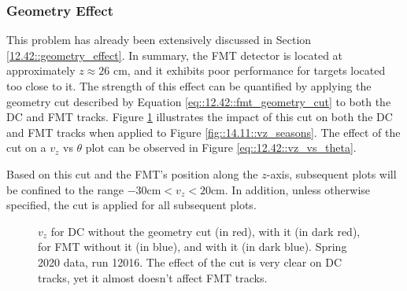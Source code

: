 \subsubsection{Geometry Effect}
\label{14.12::geometry_effect}
    This problem has already been extensively discussed in Section \ref{12.42::geometry_effect}.
    In summary, the FMT detector is located at approximately $z \approx 26$ cm, and it exhibits poor performance for targets located too close to it.
    The strength of this effect can be quantified by applying the geometry cut described by Equation \eqref{eq::12.42::fmt_geometry_cut} to both the DC and FMT tracks.
    Figure \ref{fig::14.12::vz_012016_geomcut} illustrates the impact of this cut on both the DC and FMT tracks when applied to Figure \ref{fig::14.11::vz_seasons}.
    The effect of the cut on a $v_z$ vs $\theta$ plot can be observed in Figure \ref{eq::12.42::vz_vs_theta}.

    Based on this cut and the FMT's position along the $z$-axis, subsequent plots will be confined to the range $-30 \text{cm} < v_z < 20 \text{cm}$.
    In addition, unless otherwise specified, the cut is applied for all subsequent plots.

    \begin{figure}[h!]
        \caption[$v_z$ for DC and FMT, w/ and w/out the geometry cut, run 12016]
        {$v_z$ for DC without the geometry cut (in red), with it (in dark red), for FMT without it (in blue), and with it (in dark blue).
        Spring 2020 data, run 12016.
        The effect of the cut is very clear on DC tracks, yet it almost doesn't affect FMT tracks.}
        \label{fig::14.12::vz_012016_geomcut}
    \end{figure}
